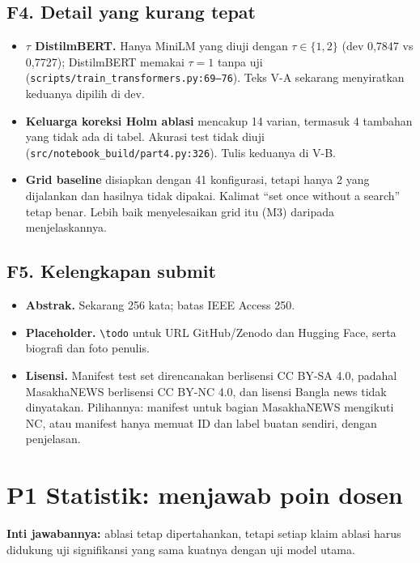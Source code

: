\documentclass[10pt,a4paper]{article}
\newcommand{\po}{\textcolor{orange!75!black}{\textbf{P1}}}
\begin{document}
\subsection*{F4. Detail yang kurang tepat}
\begin{itemize}
  \item \textbf{$\tau$ DistilmBERT.} Hanya MiniLM yang diuji dengan $\tau\in\{1,2\}$ (dev 0,7847 vs 0,7727); DistilmBERT memakai $\tau=1$ tanpa uji (\texttt{scripts/train\_transformers.py:69--76}). Teks V-A sekarang menyiratkan keduanya dipilih di dev.
  \item \textbf{Keluarga koreksi Holm ablasi} mencakup 14 varian, termasuk 4 tambahan yang tidak ada di tabel. Akurasi test tidak diuji (\texttt{src/notebook\_build/part4.py:326}). Tulis keduanya di V-B.
  \item \textbf{Grid baseline} disiapkan dengan 41 konfigurasi, tetapi hanya 2 yang dijalankan dan hasilnya tidak dipakai. Kalimat ``set once without a search'' tetap benar. Lebih baik menyelesaikan grid itu (M3) daripada menjelaskannya.
\end{itemize}

\subsection*{F5. Kelengkapan submit}
\begin{itemize}
  \item \textbf{Abstrak.} Sekarang 256 kata; batas IEEE Access 250.
  \item \textbf{Placeholder.} \texttt{\textbackslash todo} untuk URL GitHub/Zenodo dan Hugging Face, serta biografi dan foto penulis.
  \item \textbf{Lisensi.} Manifest test set direncanakan berlisensi CC BY-SA 4.0, padahal MasakhaNEWS berlisensi CC BY-NC 4.0, dan lisensi Bangla news tidak dinyatakan. Pilihannya: manifest untuk bagian MasakhaNEWS mengikuti NC, atau manifest hanya memuat ID dan label buatan sendiri, dengan penjelasan.
\end{itemize}

\section{\po{} Statistik: menjawab poin dosen}

\textbf{Inti jawabannya:} ablasi tetap dipertahankan, tetapi setiap klaim ablasi harus didukung uji signifikansi yang sama kuatnya dengan uji model utama.
\end{document}
